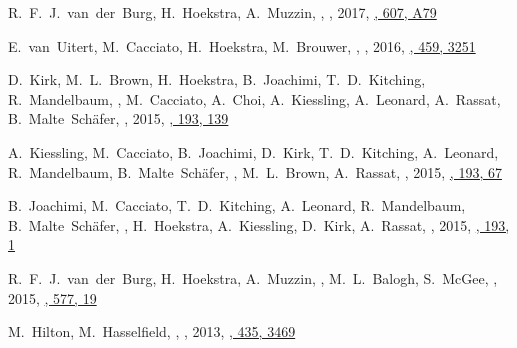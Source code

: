 \item
R.~F.~J.~van~der~Burg, H.~Hoekstra, A.~Muzzin, \myself, 
,
2017, \href{https://ui.adsabs.harvard.edu/abs/2017A&A...607A..79V}{\aap, 607, A79}

\item
E.~van~Uitert, M.~Cacciato, H.~Hoekstra, M.~Brouwer, \myself, 
,
2016, \href{https://ui.adsabs.harvard.edu/abs/2016MNRAS.459.3251V}{\mnras, 459, 3251}

\item
D.~Kirk, M.~L.~Brown, H.~Hoekstra, B.~Joachimi, T.~D.~Kitching, R.~Mandelbaum, 
\myself, M.~Cacciato, A.~Choi, A.~Kiessling, A.~Leonard, A.~Rassat, 
B.~Malte~Sch\"afer,
,
2015, \href{https://ui.adsabs.harvard.edu/abs/2015SSRv..193..139K/abstract}{\ssr, 193, 139}

\item
A.~Kiessling, M.~Cacciato, B.~Joachimi, D.~Kirk, T.~D.~Kitching, A.~Leonard, 
R.~Mandelbaum, B.~Malte~Sch\"afer, \myself, M.~L.~Brown, A.~Rassat,
,
2015, \href{https://ui.adsabs.harvard.edu/abs/2015SSRv..193...67K/abstract}{\ssr, 193, 67}

\item
B.~Joachimi, M.~Cacciato, T.~D.~Kitching, A.~Leonard, R.~Mandelbaum, 
B.~Malte~Sch\"afer, \myself, H.~Hoekstra, A.~Kiessling, D.~Kirk, A.~Rassat,
,
2015, \href{https://ui.adsabs.harvard.edu/abs/2015SSRv..193....1J/abstract}{\ssr, 193, 1}

\item
R.~F.~J.~van~der~Burg, H.~Hoekstra, A.~Muzzin, \myself, M.~L.~Balogh, S.~McGee,
,
2015, \href{https://ui.adsabs.harvard.edu/abs/2015A&A...577A..19V}{\aap, 577, 19}

\item
M.~Hilton, M.~Hasselfield, \myself, 
,
2013, \href{https://ui.adsabs.harvard.edu/abs/2013MNRAS.435.3469H/abstract}{\mnras, 435, 3469}

